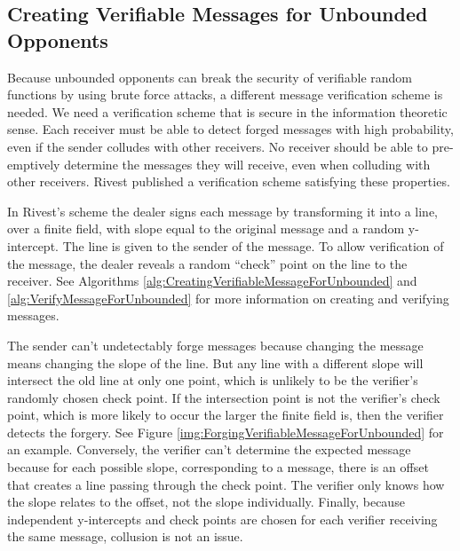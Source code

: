 \documentclass{dalcsthesis}
\begin{document}
\subsection{Creating Verifiable Messages for Unbounded Opponents}
\label{sec:vermes}

Because unbounded opponents can break the security of verifiable random functions by using brute force attacks, a different message verification scheme is needed. We need a verification scheme that is secure in the information theoretic sense. Each receiver must be able to detect forged messages with high probability, even if the sender colludes with other receivers. No receiver should be able to pre-emptively determine the messages they will receive, even when colluding with other receivers. Rivest \cite{rivest99} published a verification scheme satisfying these properties.

In Rivest's scheme the dealer signs each message by transforming it into a line, over a finite field, with slope equal to the original message and a random y-intercept. The line is given to the sender of the message. To allow verification of the message, the dealer reveals a random ``check'' point on the line to the receiver. See Algorithms \ref{alg:CreatingVerifiableMessageForUnbounded} and \ref{alg:VerifyMessageForUnbounded} for more information on creating and verifying messages.

The sender can't undetectably forge messages because changing the message means changing the slope of the line. But any line with a different slope will intersect the old line at only one point, which is unlikely to be the verifier's randomly chosen check point. If the intersection point is not the verifier's check point, which is more likely to occur the larger the finite field is, then the verifier detects the forgery. See Figure \ref{img:ForgingVerifiableMessageForUnbounded} for an example. Conversely, the verifier can't determine the expected message because for each possible slope, corresponding to a message, there is an offset that creates a line passing through the check point. The verifier only knows how the slope relates to the offset, not the slope individually. Finally, because independent y-intercepts and check points are chosen for each verifier receiving the same message, collusion is not an issue.
\end{document}
